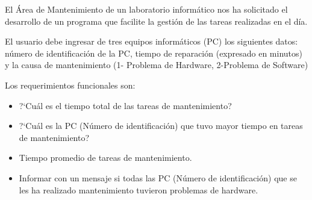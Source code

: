 El Área de Mantenimiento de un laboratorio informático nos ha solicitado el desarrollo de un programa que facilite la gestión de las tareas realizadas en el día.

El usuario debe ingresar de tres equipos informáticos (PC) los siguientes datos: número de identificación de la PC, tiempo de reparación (expresado en minutos) y la causa de mantenimiento (1- Problema de Hardware, 2-Problema de Software)

Los requerimientos funcionales son:

\begin{itemize}
\item ?`Cuál es el tiempo total de las tareas de mantenimiento?
	
\item ?`Cuál es la PC (Número de identificación) que tuvo mayor tiempo en tareas de mantenimiento?
	
\item Tiempo promedio de tareas de mantenimiento.
	
\item Informar con un mensaje si todas las PC (Número de identificación) que se les ha realizado mantenimiento tuvieron problemas de hardware.
\end{itemize}
